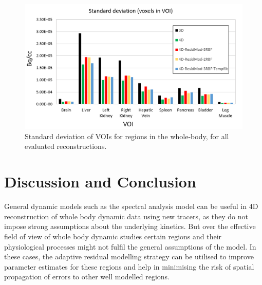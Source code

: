 \begin{figure} [h!]
\centering
\includegraphics[scale=0.65 ,angle=0]{3_Results/3_4_Residual/figures/BarPlot.png}
\caption{Standard deviation of VOIs for regions in the whole-body, for all evaluated reconstructions.} 
\label{fig:BarPlot}
\end{figure}


\section{Discussion and Conclusion}
General dynamic models such as the spectral analysis model can be useful in 4D reconstruction of whole body dynamic data using new tracers, as they do not impose strong assumptions about the underlying kinetics. But over the effective field of view of whole body dynamic studies certain regions and their physiological processes might not fulfil the general assumptions of the model. In these cases, the adaptive residual modelling strategy can be utilised to improve parameter estimates for these regions and help in minimising the risk of spatial propagation of errors to other well modelled regions.


